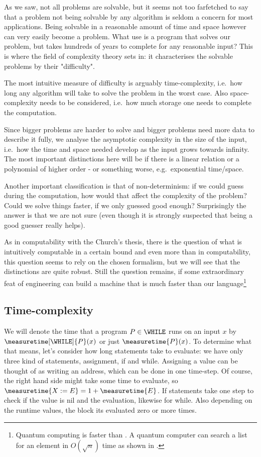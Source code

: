 As we saw, not all problems are solvable, but it seems not too farfetched to
say that a problem not being solvable by any algorithm is seldom a concern for
most applications. Being solvable in a reasonable amount of time and space
however can very easily become a problem. What use is a program that solves our
problem, but takes hundreds of years to complete for any reasonable input? This
is where the field of complexity theory sets in: it characterises the solvable
problems by their "difficulty".

The most intuitive measure of difficulty is arguably time-complexity, i.e.\ how
long any algorithm will take to solve the problem in the worst case. Also
space-complexity needs to be considered, i.e.\ how much storage one needs to
complete the computation.

Since bigger problems are harder to solve and bigger problems need more data to
describe it fully, we analyse the asymptotic complexity in the size of the
input, i.e.\ how the time and space needed develop as the input grows towards
infinity. The most important distinctions here will be if there is a linear
relation or a polynomial of higher order - or something worse, e.g.\ exponential
time/space.

Another important classification is that of non-determinism: if we could guess
during the computation, how would that affect the complexity of the problem?
Could we solve things faster, if we only guessed good enough? Surprisingly the
answer is that we are not sure (even though it is strongly suspected that being
a good guesser really helps).

As in computability with the Church's thesis, there is the question of what is
intuitively computable in a certain bound and even more than in computability,
this question seems to rely on the chosen formalism, but we will see that the
distinctions are quite robust. Still the question remains, if some
extraordinary feat of engineering can build a machine that is much faster than
our \WHILE language\footnote{Quantum computing is faster than \WHILE. A 
	quantum computer can search a list for an element in $O(\sqrt{n})$ time as 
	shown in \cite{grover1996fast}.}

\subsection{Time-complexity}
We will denote the time that a program $P\in \WHILE$ runs on an input $x$ by
$\measuretime[\WHILE]{P}(x)$ or just $\measuretime{P}(x)$. To determine what
that means, let's consider how long statements take to evaluate: we have only
three kind of statements, assignment, if and while. Assigning a value can be
thought of as writing an address, which can be done in one time-step. Of
course, the right hand side might take some time to evaluate, so
$\measuretime{X := E} = 1 + \measuretime{E}$. If statements take one step to
check if the value is nil and the evaluation, likewise for while.  Also
depending on the runtime values, the block its evaluated zero or more times.


